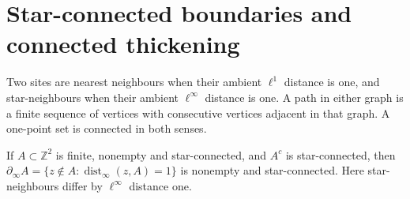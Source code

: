 \section{Star-connected boundaries and connected thickening}
\label{s:topology}

Two sites are nearest neighbours when their ambient \(\ell^1\)
distance is one, and star-neighbours when their ambient
\(\ell^\infty\) distance is one.  A path in either graph is
a finite sequence of vertices with consecutive vertices adjacent
in that graph.  A one-point set is connected in both senses.

\begin{lemma}\label{l:boundaryconn}
If \(A\subset\mathbb Z^2\) is finite, nonempty and star-connected,
and \(A^c\) is star-connected, then
\(\partial_\infty A=\{z\notin A:\operatorname{dist}_\infty(z,A)=1\}\)
is nonempty and star-connected.
Here star-neighbours differ by \(\ell^\infty\) distance one.
\end{lemma}

